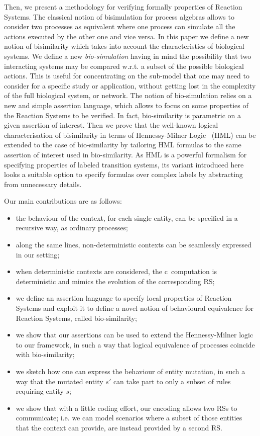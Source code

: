 Then, we present a methodology for verifying formally
properties of Reaction Systems. The classical notion of bisimulation for 
process algebras allows to consider two processes as equivalent 
where one process can simulate all the actions executed 
by the other one and vice versa. In this paper we define a new
notion of bisimilarity which takes into account the characteristics
of biological systems. We define a new {\em bio-simulation} having in mind
the possibility that two interacting systems may be compared w.r.t.
a subset of the possible biological actions. This is useful for concentrating 
on the sub-model that one may need to consider for a specific study or application,
without getting lost in the complexity of the full biological system, or network.
The notion of bio-simulation relies on a new and simple assertion language,
which allows to focus on some properties of the Reaction Systems to be verified.
In fact, bio-similarity is parametric on a given assertion of interest.
Then we prove that the well-known logical characterisation of bisimilarity in terms of Hennessy-Milner Logic~\cite{HM80} (HML)
can be extended to the case of bio-similarity by tailoring HML formulas to
the same assertion of interest used in bio-similarity.  As HML is a powerful
formalism for specifying properties of labeled transition systems, 
its variant introduced here looks a suitable option to specify formulas 
over complex labels by abstracting from unnecessary details.

Our main contributions are as follows:
\begin{itemize}
\item the behaviour of the context, for each single 
entity,
can be
specified in a recursive way, as ordinary processes;
\item along the same lines, non-deterministic contexts can be seamlessly expressed in our setting; 
\item when deterministic contexts are considered, the c\CNA \
computation is deterministic and mimics the evolution of the corresponding RS;
\item we define an assertion language to specify local properties of 
Reaction Systems and exploit it to define a novel notion of behavioural equivalence for Reaction Systems, called bio-similarity;
\item we show that our assertions can be used to extend the Hennessy-Milner logic to our framework, in such a way that logical equivalence of processes coincide with bio-similarity;
\item we sketch how one can express the behaviour of entity mutation,
in such a way that the mutated entity
$s'$ can  take part to only a subset of rules requiring entity $s$;
\item we show that with a little coding effort, our encoding allows two RSs to
communicate; i.e. we can model scenarios where a subset of those entities that the context  can
provide, are instead provided by a second RS.
\end{itemize}

